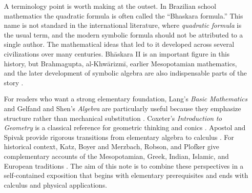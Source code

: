 A terminology point is worth making at the outset. In Brazilian school mathematics the quadratic formula is often called the ``Bhaskara formula.'' This name is not standard in the international literature, where \emph{quadratic formula} is the usual term, and the modern symbolic formula should not be attributed to a single author. The mathematical ideas that led to it developed across several civilizations over many centuries. Bh\={a}skara II is an important figure in this history, but Brahmagupta, al-Khw\={a}rizm\={i}, earlier Mesopotamian mathematics, and the later development of symbolic algebra are also indispensable parts of the story \cite{plofker2009,katz2009,boyer2011}.

For readers who want a strong elementary foundation, Lang's \emph{Basic Mathematics} and Gelfand and Shen's \emph{Algebra} are particularly useful because they emphasize structure rather than mechanical substitution \cite{lang1988,gelfandshen1993}. Coxeter's \emph{Introduction to Geometry} is a classical reference for geometric thinking and conics \cite{coxeter1969}. Apostol and Spivak provide rigorous transitions from elementary algebra to calculus \cite{apostol1967,spivak2008}. For historical context, Katz, Boyer and Merzbach, Robson, and Plofker give complementary accounts of the Mesopotamian, Greek, Indian, Islamic, and European traditions \cite{katz2009,boyer2011,robson2008,plofker2009}. The aim of this note is to combine these perspectives in a self-contained exposition that begins with elementary prerequisites and ends with calculus and physical applications.

